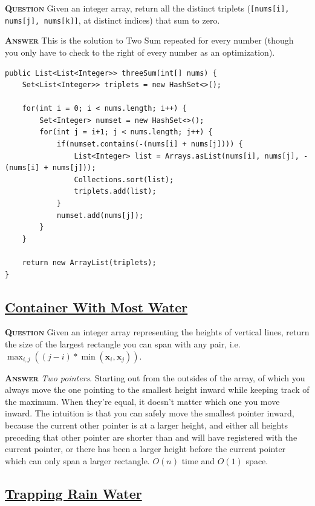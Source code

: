 \documentclass[table, xcdraw]{article}%
\begin{document}
\textsc{\textbf{Question}} Given an integer array, return all the distinct triplets (\texttt{[nums[i], nums[j], nums[k]]}, at distinct indices) that sum to zero.

\textsc{\textbf{Answer}} This is the solution to Two Sum repeated for every number (though you only have to check to the right of every number as an optimization).

\begin{verbatim}
public List<List<Integer>> threeSum(int[] nums) {
    Set<List<Integer>> triplets = new HashSet<>();

    for(int i = 0; i < nums.length; i++) {
        Set<Integer> numset = new HashSet<>();
        for(int j = i+1; j < nums.length; j++) {
            if(numset.contains(-(nums[i] + nums[j]))) {
                List<Integer> list = Arrays.asList(nums[i], nums[j], -(nums[i] + nums[j]));
                Collections.sort(list);
                triplets.add(list);
            }
            numset.add(nums[j]);
        }
    }

    return new ArrayList(triplets);
}
\end{verbatim}

\subsection{\href{https://leetcode.com/problems/container-with-most-water}{Container With Most Water}}

\textsc{\textbf{Question}} Given an integer array representing the heights of vertical lines, return the size of the largest rectangle you can span with any pair, i.e. $\max_{i,j} ( (j - i) * \min(\mathbf{x}_i, \mathbf{x}_j) )$.

\textsc{\textbf{Answer}} \textit{Two pointers}. Starting out from the outsides of the array, of which you always move the one pointing to the smallest height inward while keeping track of the maximum. When they're equal, it doesn't matter which one you move inward. The intuition is that you can safely move the smallest pointer inward, because the current other pointer is at a larger height, and either all heights preceding that other pointer are shorter than and will have registered with the current pointer, or there has been a larger height before the current pointer which can only span a larger rectangle. $O(n)$ time and $O(1)$ space.

\subsection{\href{https://leetcode.com/problems/trapping-rain-water}{Trapping Rain Water}}
\end{document}
